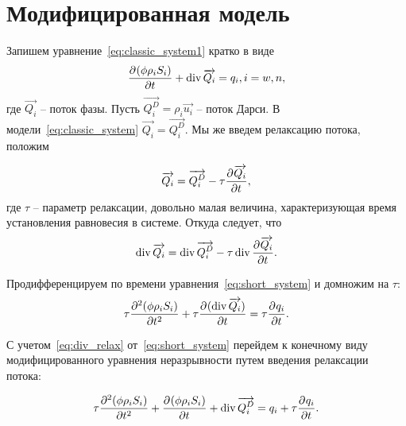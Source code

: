 \section{Модифицированная модель}
\label{mod_model}

Запишем уравнение~\eqref{eq:classic_system1} кратко в виде
\begin{equation} \label{eq:short_system}
   \pd{(\phi \rho_i S_i)}{t} + \diver{ \overrightarrow{Q_i}} = q_i, i = w,n,
\end{equation}
где $\overrightarrow{Q_i}$ -- поток фазы.
Пусть $\overrightarrow{Q_i^D} = \rho_i \overrightarrow{u_i}$ -- поток Дарси.
В модели~\eqref{eq:classic_system} $\overrightarrow{Q_i} = \overrightarrow{Q_i^D}$.
Мы же введем релаксацию потока, положим 

\begin{equation}
 \overrightarrow{Q_i} = \overrightarrow{Q_i^D} - \tau \pd{\overrightarrow{Q_i}}{t},
\end{equation}
где $\tau$ -- параметр релаксации, довольно малая величина, характеризующая время установления равновесия в системе. Откуда следует, что
\begin{equation} \label{eq:div_relax}
 \diver{\overrightarrow{Q_i}} = \diver{\overrightarrow{Q_i^D}} - \tau \diver{\pd{\overrightarrow{Q_i}}{t}}.
\end{equation}

Продифференцируем по времени уравнения~\eqref{eq:short_system} и домножим на $\tau$:
\begin{equation}
  \tau \pd[2]{(\phi \rho_i S_i)}{t} + \tau \pd{(\diver{ \overrightarrow{Q_i}})}{t} = \tau \pd{q_i}{t}.
\end{equation}

С учетом~\eqref{eq:div_relax} от~\eqref{eq:short_system} перейдем к конечному виду модифицированного уравнения неразрывности
путем введения релаксации потока:

\begin{equation} \label{eq:mod_system}
  \tau \pd[2]{(\phi \rho_i S_i)}{t} + \pd{(\phi \rho_i S_i)}{t} + \diver{ \overrightarrow{Q_i^D}} = q_i + \tau \pd{q_i}{t}.
\end{equation}


